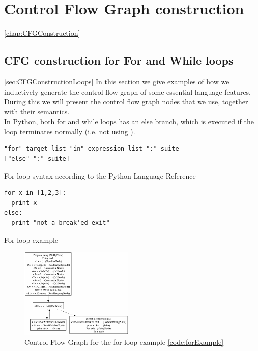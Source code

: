 \chapter{Control Flow Graph construction}
\ref{chap:CFGConstruction}

\section{CFG construction for For and While loops}
\ref{sec:CFGConstructionLoops}
In this section we give examples of how we inductively generate the control flow graph of some essential language features. During this we will present the control flow graph nodes that we use, together with their semantics. \\
In Python, both for and while loops has an else branch, which is executed if the loop terminates normally (i.e. not using ).

\begin{listing}[H]
	\begin{verbatim}
"for" target_list "in" expression_list ":" suite 
["else" ":" suite]
	\end{verbatim}
	\caption{For-loop syntax according to the Python Language Reference}\label{code:forSyntax}
\end{listing}

\begin{listing}[H]
	\begin{verbatim}
for x in [1,2,3]:
  print x
else:
  print "not a break'ed exit"
	\end{verbatim}
	\caption{For-loop example}\label{code:forExample}
\end{listing}

\begin{figure}
	\vspace{-20pt}
	\begin{center}
		\includegraphics[width=0.48\textwidth]{images/for-example-cfg.png}
	\end{center}
	\vspace{-10pt}
	\caption{Control Flow Graph for the for-loop example \ref{code:forExample}}
	\label{fig:forCfg}
	\vspace{-10pt}
\end{figure}

